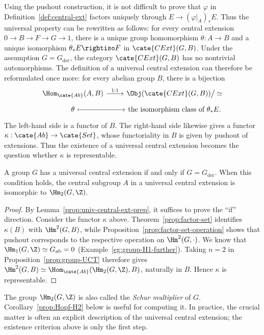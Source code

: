 Using the pushout construction, it is not difficult to prove that $\varphi$
in Definition~\ref{def:central-ext} factors uniquely through
$E\to(\varphi|_A)_*E$. Thus the universal property can be rewritten as
follows: for every central extension $0\to B\to F\to G\to1$, there is a
unique group homomorphism $\theta:A\to B$ and a unique isomorphism
$\theta_*E\rightiso F$ in $\cate{CExt}(G,B)$. Under the assumption
$G=G_{\mathrm{der}}$, the category $\cate{CExt}(G,B)$ has no nontrivial
automorphisms. The definition of a universal central extension can therefore
be reformulated once more: for every abelian group $B$, there is a bijection
\[\begin{tikzcd}[row sep=tiny]
	\Hom_{\cate{Ab}}(A,B) \arrow[r,"1:1"] &
	\Obj(\cate{CExt}(G,B))\big/\simeq \\
	\theta \arrow[mapsto,r] & \text{the isomorphism class of }\theta_*E.
\end{tikzcd}\]
The left-hand side is a functor of $B$. The right-hand side likewise gives a
functor $\kappa:\cate{Ab}\to\cate{Set}$, whose functoriality in $B$ is given
by pushout of extensions. Thus the existence of a universal central extension
becomes the question whether $\kappa$ is representable.

\begin{theorem}
	A group $G$ has a universal central extension if and only if
	$G=G_{\mathrm{der}}$. When this condition holds, the central subgroup $A$
	in a universal central extension is isomorphic to $\Hm_2(G,\Z)$.
\end{theorem}
\begin{proof}
	By Lemma~\ref{prop:univ-central-ext-prep}, it suffices to prove the “if”
	direction. Consider the functor $\kappa$ above.
	Theorem~\ref{prop:factor-set} identifies $\kappa(B)$ with $\Hm^2(G,B)$,
	while Proposition~\ref{prop:factor-set-operation} shows that pushout
	corresponds to the respective operation on $\Hm^2(G,\cdot)$. We know that
	$\Hm_1(G,\Z)\simeq G_{\mathrm{ab}}=0$
	(Example~\ref{eg:group-H1-further}). Taking $n=2$ in
	Proposition~\ref{prop:group-UCT} therefore gives
	$\Hm^2(G,B)\simeq\Hom_{\cate{Ab}}(\Hm_2(G,\Z),B)$, naturally in $B$.
	Hence $\kappa$ is representable.
\end{proof}

The group $\Hm_2(G,\Z)$ is also called the \emph{Schur multiplier} of $G$.
Corollary~\ref{prop:Hopf-H2} below is useful for computing it. In practice,
the crucial matter is often an explicit description of the universal central
extension; the existence criterion above is only the first step.


